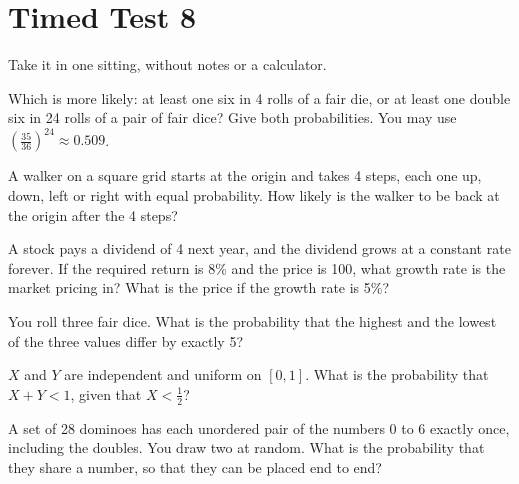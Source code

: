 \chapter{Timed Test 8}\label{ch:iv1:timed-test-8}

\begin{ivtrains}
Take it in one sitting, without notes or a calculator.
\end{ivtrains}


\begin{question}\label{iq:iv1:timed-test-8:1}
Which is more likely: at least one six in 4 rolls of a fair die, or at least one double six in 24 rolls of a pair of fair dice? Give both probabilities. You may use $(\frac{35}{36})^{24} \approx 0.509$.
\end{question}

\begin{question}\label{iq:iv1:timed-test-8:2}
A walker on a square grid starts at the origin and takes 4 steps, each one up, down, left or right with equal probability. How likely is the walker to be back at the origin after the 4 steps?
\end{question}

\begin{question}\label{iq:iv1:timed-test-8:3}
A stock pays a dividend of 4 next year, and the dividend grows at a constant rate forever. If the required return is 8\% and the price is 100, what growth rate is the market pricing in? What is the price if the growth rate is 5\%?
\end{question}

\begin{question}\label{iq:iv1:timed-test-8:4}
You roll three fair dice. What is the probability that the highest and the lowest of the three values differ by exactly 5?
\end{question}

\begin{question}\label{iq:iv1:timed-test-8:5}
$X$ and $Y$ are independent and uniform on $[0, 1]$. What is the probability that $X + Y < 1$, given that $X < \frac12$?
\end{question}

\begin{question}\label{iq:iv1:timed-test-8:6}
A set of 28 dominoes has each unordered pair of the numbers 0 to 6 exactly once, including the doubles. You draw two at random. What is the probability that they share a number, so that they can be placed end to end?
\end{question}

